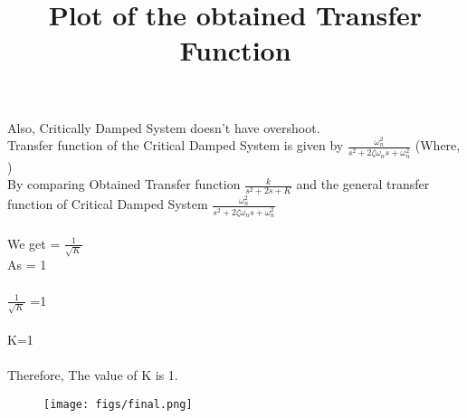 \documentclass{beamer}
\begin{document}
\begin{frame}
Also, Critically Damped System doesn't have overshoot.\\
Transfer function of the Critical Damped System is given by
\(\frac{\omega_n^2}{s^2+2\zeta\omega_ns +\omega_n^2}\) (Where, )\\
By comparing Obtained Transfer function \(\frac{k}{s^2+2s+K}\) and the general transfer function of Critical Damped System \(\frac{\omega_n^2}{s^2+2\zeta\omega_ns +\omega_n^2}\)\\
\vspace{5mm}\\
We get \zeta = \(\frac{1}{\sqrt{K}}\)\\
As \zeta = 1\\
\vspace{5mm}\\
\(\frac{1}{\sqrt{K}}\) =1\\
\vspace{5mm}\\
K=1\\
\vspace{5mm}\\
Therefore, The value of K is 1.\\




\end{frame}
\begin{frame}
\title{Plot of the obtained Transfer Function}
\begin{figure}
    \texttt{[image: figs/final.png]}

    
\end{figure}



\end{frame}
\end{document}
